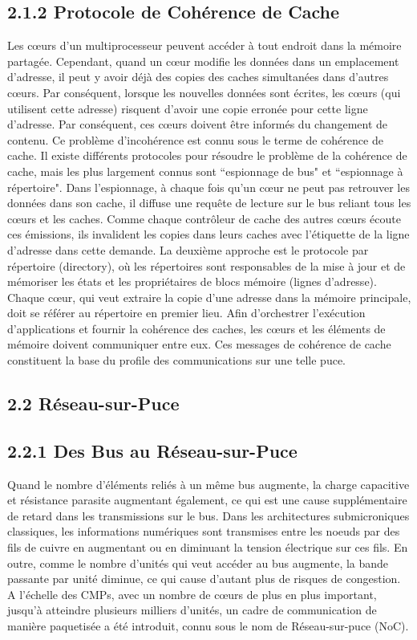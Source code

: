 \subsection*{2.1.2 Protocole de Cohérence de Cache}
Les cœurs d’un multiprocesseur peuvent accéder à tout endroit dans la mémoire partagée. Cependant, quand un cœur modifie les données dans un emplacement d'adresse, il peut y avoir déjà des copies des caches simultanées dans d'autres cœurs. Par conséquent, lorsque les nouvelles données sont écrites, les cœurs (qui utilisent cette adresse) risquent d’avoir une copie erronée pour cette ligne d'adresse. Par conséquent, ces cœurs doivent être informés du changement de contenu. Ce problème d'incohérence est connu sous le terme de cohérence de cache. Il existe différents protocoles pour résoudre le problème de la cohérence de cache, mais les plus largement connus sont ``espionnage de bus" et  ``espionnage à répertoire". Dans l'espionnage, à chaque fois qu’un cœur ne peut pas retrouver les données dans son cache, il diffuse une requête de lecture sur le bus reliant tous les cœurs et les caches. Comme chaque contrôleur de cache des autres cœurs écoute ces émissions, ils invalident les copies dans leurs caches avec l'étiquette de la ligne d'adresse dans cette demande. La deuxième approche est le protocole par répertoire (directory), où les répertoires sont responsables de la mise à jour et de mémoriser les états et les propriétaires de blocs mémoire (lignes d'adresse). Chaque cœur, qui veut extraire la copie d'une adresse dans la mémoire principale, doit se référer au répertoire en premier lieu. Afin d'orchestrer l'exécution d'applications et fournir la cohérence des caches, les cœurs et les éléments de mémoire doivent communiquer entre eux. Ces messages de cohérence de cache constituent la base du profile des communications sur une telle puce. 	 	

\subsection*{2.2 Réseau-sur-Puce}
\subsection*{2.2.1 Des Bus au Réseau-sur-Puce}
Quand le nombre d'éléments reliés à un même bus augmente, la charge capacitive et résistance parasite augmentant également, ce qui est une cause supplémentaire de retard dans les transmissions sur le bus. Dans les architectures submicroniques classiques, les informations numériques sont transmises entre les noeuds par des fils de cuivre en augmentant ou en diminuant la tension électrique sur ces fils. En outre, comme le nombre d'unités qui veut accéder au bus augmente, la bande passante par unité diminue, ce qui cause d’autant plus de risques de congestion. A l'échelle des CMPs, avec un nombre de cœurs de plus en plus important, jusqu’à atteindre plusieurs milliers d’unités, un cadre de communication de manière paquetisée a été introduit, connu sous le nom de Réseau-sur-puce (NoC).

